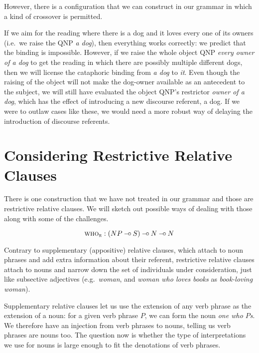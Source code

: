\begin{exe}
\end{exe}

However, there is a configuration that we can construct in our grammar in
which a kind of crossover is permitted.

\begin{exe}
\end{exe}

If we aim for the reading where there is a dog and it loves every one of
its owners (i.e.\ we raise the QNP \emph{a dog}), then everything works
correctly: we predict that the binding is impossible. However, if we raise
the whole object QNP \emph{every owner of a dog} to get the reading in
which there are possibly multiple different dogs, then we will license the
cataphoric binding from \emph{a dog} to \emph{it}. Even though the raising
of the object will not make the dog-owner available as an antecedent to the
subject, we will still have evaluated the object QNP's restrictor
\emph{owner of a dog}, which has the effect of introducing a new discourse
referent, a dog. If we were to outlaw cases like these, we would need a
more robust way of delaying the introduction of discourse referents.


\section{Considering Restrictive Relative Clauses}
\label{sec:relative-clauses}

There is one construction that we have not treated in our grammar and those
are restrictive relative clauses. We will sketch out possible ways of
dealing with those along with some of the challenges.

$$
\textsc{who}_{\textsc{r}} : (NP \mathbin{{-}\mkern-3.5mu{\circ}} S) \mathbin{{-}\mkern-3.5mu{\circ}} N \mathbin{{-}\mkern-3.5mu{\circ}} N
$$

Contrary to supplementary (appositive) relative clauses, which attach to
noun phrases and add extra information about their referent, restrictive
relative clauses attach to nouns and narrow down the set of individuals
under consideration, just like subsective adjectives (e.g.\ \emph{woman},
and \emph{woman who loves books} as \emph{book-loving woman}).

Supplementary relative clauses let us use the extension of any verb phrase
as the extension of a noun: for a given verb phrase $P$, we can form the
noun \emph{one who $P$s}. We therefore have an injection from verb phrases
to nouns, telling us verb phrases are nouns too. The question now is
whether the type of interpretations we use for nouns is large enough to fit
the denotations of verb phrases.

